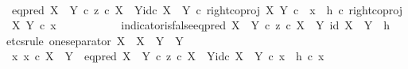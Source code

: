 \begin{isabellebody}
\ \isamarkupfalse%
\ {\isachardoublequoteopen}{\isacharparenleft}{\kern0pt}{\isacharparenleft}{\kern0pt}eq{\isacharunderscore}{\kern0pt}pred\ {\isacharparenleft}{\kern0pt}X\ {\isasymCoprod}\ Y{\isacharparenright}{\kern0pt}\ {\isasymcirc}\isactrlsub c\ {\isasymlangle}z\ {\isasymcirc}\isactrlsub c\ {\isasymbeta}\isactrlbsub X\ {\isasymCoprod}\ Y\isactrlesub {\isacharcomma}{\kern0pt}id\isactrlsub c\ {\isacharparenleft}{\kern0pt}X\ {\isasymCoprod}\ Y{\isacharparenright}{\kern0pt}{\isasymrangle}{\isacharparenright}{\kern0pt}\ {\isasymcirc}\isactrlsub c\ right{\isacharunderscore}{\kern0pt}coproj\ X\ Y{\isacharparenright}{\kern0pt}\ {\isasymcirc}\isactrlsub c\ \ x\ {\isacharequal}{\kern0pt}\ {\isacharparenleft}{\kern0pt}h\ {\isasymcirc}\isactrlsub c\ right{\isacharunderscore}{\kern0pt}coproj\ X\ Y{\isacharparenright}{\kern0pt}\ {\isasymcirc}\isactrlsub c\ x{\isachardoublequoteclose}\isacommand{{\isachardot}{\kern0pt}}\isamarkupfalse%
\isanewline
\ \ \ \ \isamarkupfalse%
\isanewline
\ \ \isamarkupfalse%
\isanewline
\ \ \isamarkupfalse%
\ indicator{\isacharunderscore}{\kern0pt}is{\isacharunderscore}{\kern0pt}false{\isacharcolon}{\kern0pt}{\isachardoublequoteopen}eq{\isacharunderscore}{\kern0pt}pred\ {\isacharparenleft}{\kern0pt}X\ {\isasymCoprod}\ Y{\isacharparenright}{\kern0pt}\ {\isasymcirc}\isactrlsub c\ {\isasymlangle}z\ {\isasymcirc}\isactrlsub c\ {\isasymbeta}\isactrlbsub X\ {\isasymCoprod}\ Y\isactrlesub {\isacharcomma}{\kern0pt}\ id\ {\isacharparenleft}{\kern0pt}X\ {\isasymCoprod}\ Y{\isacharparenright}{\kern0pt}{\isasymrangle}\ {\isacharequal}{\kern0pt}\ h{\isachardoublequoteclose}\isanewline
\ \ \isamarkupfalse%
{\isacharparenleft}{\kern0pt}etcs{\isacharunderscore}{\kern0pt}rule\ one{\isacharunderscore}{\kern0pt}separator{\isacharbrackleft}{\kern0pt}\ X\ {\isacharequal}{\kern0pt}\ {\isachardoublequoteopen}X\ {\isasymCoprod}\ Y{\isachardoublequoteclose}{\isacharcomma}{\kern0pt}\ \ Y\ {\isacharequal}{\kern0pt}\ {\isasymOmega}{\isacharbrackright}{\kern0pt}{\isacharparenright}{\kern0pt}\isanewline
\ \ \ \ \isamarkupfalse%
\ {\isachardoublequoteopen}{\isasymAnd}x{\isachardot}{\kern0pt}\ x\ {\isasymin}\isactrlsub c\ X\ {\isasymCoprod}\ Y\ {\isasymLongrightarrow}\ {\isacharparenleft}{\kern0pt}eq{\isacharunderscore}{\kern0pt}pred\ {\isacharparenleft}{\kern0pt}X\ {\isasymCoprod}\ Y{\isacharparenright}{\kern0pt}\ {\isasymcirc}\isactrlsub c\ {\isasymlangle}z\ {\isasymcirc}\isactrlsub c\ {\isasymbeta}\isactrlbsub X\ {\isasymCoprod}\ Y\isactrlesub {\isacharcomma}{\kern0pt}id\isactrlsub c\ {\isacharparenleft}{\kern0pt}X\ {\isasymCoprod}\ Y{\isacharparenright}{\kern0pt}{\isasymrangle}{\isacharparenright}{\kern0pt}\ {\isasymcirc}\isactrlsub c\ x\ {\isacharequal}{\kern0pt}\ h\ {\isasymcirc}\isactrlsub c\ x{\isachardoublequoteclose}\isanewline

\end{isabellebody}
